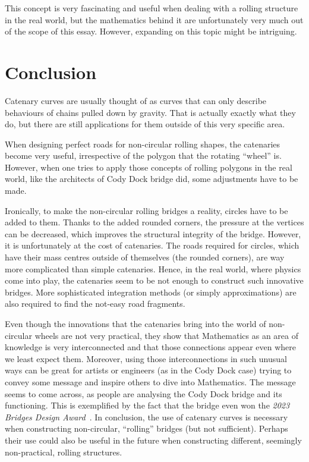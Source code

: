 \documentclass[12pt]{article}
\begin{document}
        This concept is very fascinating and useful when dealing with a rolling structure in the real world, but the mathematics behind it are unfortunately very much out of the scope of this essay. However, expanding on this topic might be intriguing.

    \section{Conclusion}

        Catenary curves are usually thought of as curves that can only describe behaviours of chains pulled down by gravity. That is actually exactly what they do, but there are still applications for them outside of this very specific area.

        When designing perfect roads for non-circular rolling shapes, the catenaries become very useful, irrespective of the polygon that the rotating ``wheel'' is. However, when one tries to apply those concepts of rolling polygons in the real world, like the architects of Cody Dock bridge did, some adjustments have to be made.

        Ironically, to make the non-circular rolling bridges a reality, circles have to be added to them. Thanks to the added rounded corners, the pressure at the vertices can be decreased, which improves the structural integrity of the bridge. However, it is unfortunately at the cost of catenaries. The roads required for circles, which have their mass centres outside of themselves (the rounded corners), are way more complicated than simple catenaries. Hence, in the real world, where physics come into play, the catenaries seem to be not enough to construct such innovative bridges. More sophisticated integration methods (or simply approximations) are also required to find the not-easy road fragments.

        Even though the innovations that the catenaries bring into the world of non-circular wheels are not very practical, they show that Mathematics as an area of knowledge is very interconnected and that those connections appear even where we least expect them. Moreover, using those interconnections in such unusual ways can be great for artists or engineers (as in the Cody Dock case) trying to convey some message and inspire others to dive into Mathematics. The message seems to come across, as people are analysing the Cody Dock bridge and its functioning. This is exemplified by the fact that the bridge even won the \textit{2023 Bridges Design Award}~\cite{bridges_awards}. In conclusion, the use of catenary curves is necessary when constructing non-circular, ``rolling'' bridges (but not sufficient). Perhaps their use could also be useful in the future when constructing different, seemingly non-practical, rolling structures.
\end{document}
